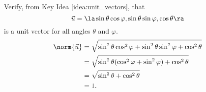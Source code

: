 {Verify, from Key Idea \ref{idea:unit_vectors}, that 
\[
\vec u=\la \sin\theta\cos\varphi,\sin\theta\sin\varphi,\cos\theta\ra
\]
is a unit vector for all angles $\theta$ and $\varphi$.
}
{\begin{align*}
\norm{\vec u} &= \sqrt{\sin^2\theta\cos^2\varphi+\sin^2\theta\sin^2\varphi+\cos^2\theta}\\
						&= \sqrt{\sin^2\theta(\cos^2\varphi+\sin^2\varphi)+\cos^2\theta}\\
						&= \sqrt{\sin^2\theta+\cos^2\theta}\\
						&=1.
\end{align*}
}
